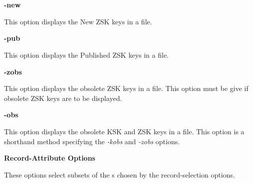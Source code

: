 \begin{description}
\item {\bf -new}\verb" "

This option displays the New ZSK keys in a  file.

\item {\bf -pub}\verb" "

This option displays the Published ZSK keys in a  file.

\item {\bf -zobs}\verb" "

This option displays the obsolete ZSK keys in a  file.  This
option must be give if obsolete ZSK keys are to be displayed.

\item {\bf -obs}\verb" "

This option displays the obsolete KSK and ZSK keys in a  file.
This option is a shorthand method specifying the {\it -kobs} and {\it -zobs}
options.

\end{description}

{\bf Record-Attribute Options}

These options select subsets of the s chosen by the
record-selection options. 

